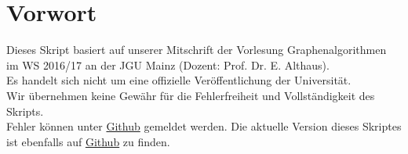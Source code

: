 \chapter{Vorwort}
Dieses Skript basiert auf unserer Mitschrift der Vorlesung Graphenalgorithmen im WS 2016/17 an der JGU Mainz (Dozent: Prof. Dr. E. Althaus).\\ 
Es handelt sich nicht um eine offizielle  Veröffentlichung  der Universität.\\
Wir übernehmen keine Gewähr für die Fehlerfreiheit und Vollständigkeit des Skripts.\\
Fehler können unter \href{https://github.com/Gusser93/GraphenalgorithmenVorlesung}{Github} gemeldet werden. Die aktuelle Version dieses Skriptes ist ebenfalls auf  \href{https://github.com/Gusser93/GraphenalgorithmenVorlesung}{Github} zu finden.